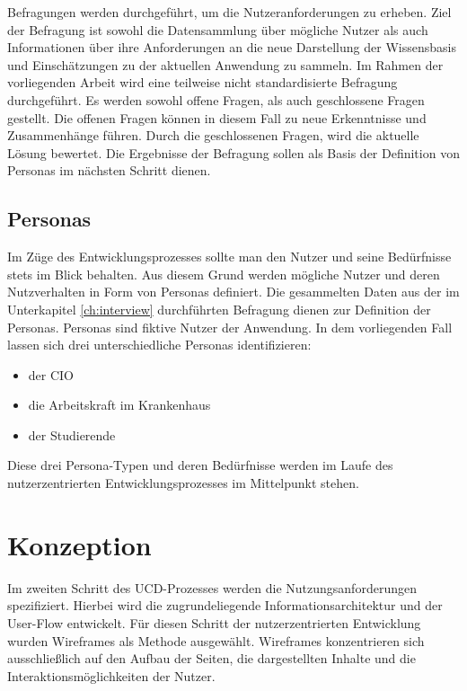 Befragungen werden durchgeführt, um die Nutzeranforderungen zu erheben.
Ziel der Befragung ist sowohl die Datensammlung über mögliche Nutzer als auch Informationen über ihre Anforderungen an die neue Darstellung der Wissensbasis und Einschätzungen zu der aktuellen Anwendung zu sammeln. 
Im Rahmen der vorliegenden Arbeit wird eine teilweise nicht standardisierte Befragung durchgeführt.
Es werden sowohl offene Fragen, als auch geschlossene Fragen gestellt.
Die offenen Fragen können in diesem Fall zu neue Erkenntnisse und Zusammenhänge führen.
Durch die geschlossenen Fragen, wird die aktuelle Lösung bewertet.
Die Ergebnisse der Befragung sollen als Basis der Definition von Personas im nächsten Schritt dienen.

\subsection{Personas}

Im Züge des Entwicklungsprozesses sollte man den Nutzer und seine Bedürfnisse stets im Blick behalten.
Aus diesem Grund werden mögliche Nutzer und deren Nutzverhalten in Form von Personas definiert.
Die gesammelten Daten aus der im Unterkapitel \ref{ch:interview} durchführten Befragung dienen zur Definition der Personas.
Personas sind fiktive Nutzer der Anwendung.
In dem vorliegenden Fall lassen sich drei unterschiedliche Personas identifizieren:

\begin{itemize}
	\item der \ac{CIO}
	\item die Arbeitskraft im Krankenhaus
	\item der Studierende
\end{itemize}

Diese drei Persona-Typen und deren Bedürfnisse werden im Laufe des nutzerzentrierten Entwicklungsprozesses im Mittelpunkt stehen.

\section{Konzeption}\label{sec:concept}

Im zweiten Schritt des \ac{UCD}-Prozesses werden die Nutzungsanforderungen spezifiziert.
Hierbei wird die zugrundeliegende Informationsarchitektur und der User-Flow entwickelt.
Für diesen Schritt der nutzerzentrierten Entwicklung wurden Wireframes als Methode ausgewählt.
Wireframes konzentrieren sich ausschließlich auf den Aufbau der Seiten, die dargestellten Inhalte und die Interaktionsmöglichkeiten der Nutzer.


